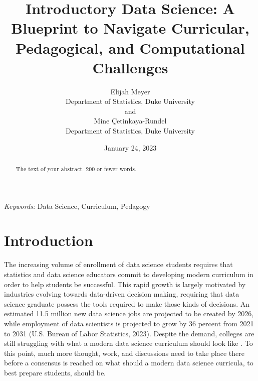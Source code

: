 \documentclass[
  12pt]{article}
\begin{document}
\def\spacingset#1{\renewcommand{\baselinestretch}%
{#1}\small\normalsize} \spacingset{1}



\date{January 24, 2023}
\title{\bf Introductory Data Science: A Blueprint to Navigate
Curricular, Pedagogical, and Computational Challenges}
\author{
Elijah Meyer\\
Department of Statistics, Duke University\\
and\\Mine Çetinkaya-Rundel\\
Department of Statistics, Duke University\\
}
\maketitle

\bigskip
\bigskip
\begin{abstract}
The text of your abstract. 200 or fewer words.
\end{abstract}

\noindent%
{\it Keywords:} Data Science, Curriculum, Pedagogy
\vfill

\newpage
\spacingset{1.9} %
\ifdefined\Shaded\renewenvironment{Shaded}{\begin{tcolorbox}[sharp corners, frame hidden, borderline west={3pt}{0pt}{shadecolor}, boxrule=0pt, enhanced, interior hidden, breakable]}{\end{tcolorbox}}\fi

\hypertarget{sec-intro}{%
\section{Introduction}\label{sec-intro}}

The increasing volume of enrollment of data science students
\citep{Redmond2022} requires that statistics and data science educators
commit to developing modern curriculum in order to help students be
successful. This rapid growth is largely motivated by industries
evolving towards data-driven decision making, requiring that data
science graduate possess the tools required to make those kinds of
decisions. An estimated 11.5 million new data science jobs are projected
to be created by 2026, while employment of data scientists is projected
to grow by 36 percent from 2021 to 2031 (U.S. Bureau of Labor
Statistics, 2023). Despite the demand, colleges are still struggling
with what a modern data science curriculum should look like
\citep{Schwab2020}. To this point, much more thought, work, and
discussions need to take place there before a consensus is reached on
what should a modern data science curricula, to best prepare students,
should be.
\end{document}
